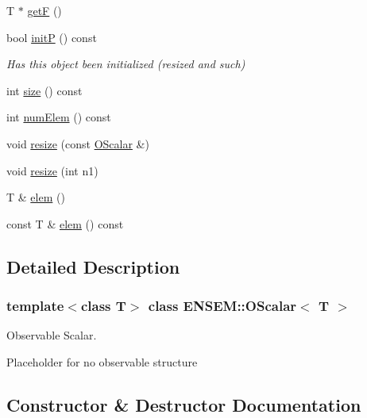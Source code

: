 \begin{DoxyCompactItemize}
T $\ast$ \mbox{\hyperlink{classENSEM_1_1OScalar_a040999918115f255a411fd96ad87663f}{getF}} ()
\item 
bool \mbox{\hyperlink{classENSEM_1_1OScalar_a2de94d9cb377fa4ca961d0a8906a76b6}{initP}} () const
\begin{DoxyCompactList}\small\item\em Has this object been initialized (resized and such) \end{DoxyCompactList}\item 
int \mbox{\hyperlink{classENSEM_1_1OScalar_a2029adc2feeab03e85a091ab6878fc2d}{size}} () const
\item 
int \mbox{\hyperlink{classENSEM_1_1OScalar_aa9a7a2cddc34ba1add28369a764ced80}{num\+Elem}} () const
\item 
void \mbox{\hyperlink{classENSEM_1_1OScalar_ab7d5b96a7f1a3451bedd04eda3169c84}{resize}} (const \mbox{\hyperlink{classENSEM_1_1OScalar}{O\+Scalar}} \&)
\item 
void \mbox{\hyperlink{classENSEM_1_1OScalar_ab8b1ad6566b12cb3036794b47bb0ae8d}{resize}} (int n1)
\item 
T \& \mbox{\hyperlink{classENSEM_1_1OScalar_af07cc94eb09bfc29991d8fdc30727574}{elem}} ()
\item 
const T \& \mbox{\hyperlink{classENSEM_1_1OScalar_af797ae7d3763acab7b024aa159b3a7b8}{elem}} () const
\end{DoxyCompactItemize}


\subsection{Detailed Description}
\subsubsection*{template$<$class T$>$\newline
class E\+N\+S\+E\+M\+::\+O\+Scalar$<$ T $>$}

Observable Scalar. 

Placeholder for no observable structure 

\subsection{Constructor \& Destructor Documentation}
\mbox{\label{classENSEM_1_1OScalar_abd51915d3c7af4b8ea33923eee128c2c}} 
